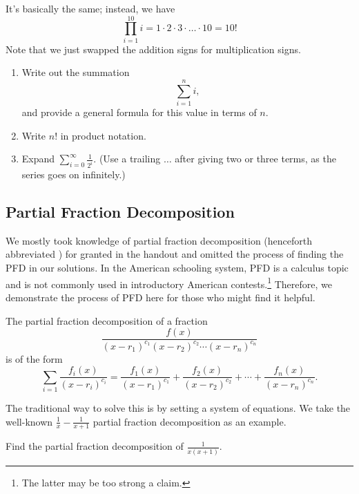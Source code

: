 \documentclass{article}
\begin{document}
\begin{sol}
It's basically the same; instead, we have $$\prod\limits_{i=1}^{10} i=1\cdot 2\cdot 3\cdot \dots \cdot 10=10!$$ Note that we just swapped the addition signs for multiplication signs.
\end{sol}

\begin{exer}\hfill
\begin{enumerate}
    \item Write out the summation $$\sum\limits_{i=1}^{n} i,$$ and provide a general formula for this value in terms of $n.$
    
    \item Write $n!$ in product notation.

    \item Expand $\sum\limits_{i=0}^{\infty} \frac{1}{2^i}.$ (Use a trailing $\dots$ after giving two or three terms, as the series goes on infinitely.)
\end{enumerate}
\end{exer}

\subsection{Partial Fraction Decomposition}

We mostly took knowledge of partial fraction decomposition (henceforth abbreviated ) for granted in the handout and omitted the process of finding the PFD in our solutions. In the American schooling system, PFD is a calculus topic and is not commonly used in introductory American contests.\footnote{The latter may be too strong a claim.} Therefore, we demonstrate the process of PFD here for those who might find it helpful.

\begin{defi}
The partial fraction decomposition of a fraction
\[\frac{f(x)}{(x-r_1)^{c_1}(x-r_2)^{c_2}\cdots (x-r_n)^{c_n}}\]
is of the form
\[\sum_{i=1}\frac{f_i(x)}{(x-r_i)^{c_i}}=\frac{f_1(x)}{(x-r_1)^{c_1}}+\frac{f_2(x)}{(x-r_2)^{c_2}}+\cdots+\frac{f_n(x)}{(x-r_n)^{c_n}}.\]
\end{defi}

The traditional way to solve this is by setting a system of equations. We take the well-known $\frac{1}{x}-\frac{1}{x+1}$ partial fraction decomposition as an example.

\begin{exam}
Find the partial fraction decomposition of $\frac{1}{x(x+1)}.$
\end{exam}
\end{document}
